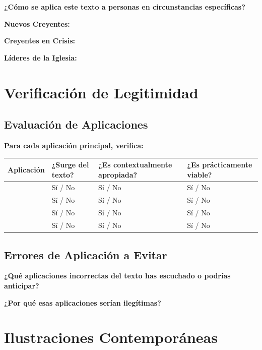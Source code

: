 \documentclass[11pt,a4paper]{article}
\begin{document}
\textbf{¿Cómo se aplica este texto a personas en circunstancias específicas?}

\textbf{Nuevos Creyentes:}
\vspace{2cm}

\textbf{Creyentes en Crisis:}
\vspace{2cm}

\textbf{Líderes de la Iglesia:}
\vspace{2cm}

\newpage

\section{Verificación de Legitimidad}

\subsection{Evaluación de Aplicaciones}

\textbf{Para cada aplicación principal, verifica:}

\begin{tabular}{|p{4cm}|p{3cm}|p{3cm}|p{3cm}|}
\hline
\textbf{Aplicación} & \textbf{¿Surge del texto?} & \textbf{¿Es contextualmente apropiada?} & \textbf{¿Es prácticamente viable?} \\
\hline
& Sí / No & Sí / No & Sí / No \\[1cm]
\hline
& Sí / No & Sí / No & Sí / No \\[1cm]
\hline
& Sí / No & Sí / No & Sí / No \\[1cm]
\hline
& Sí / No & Sí / No & Sí / No \\[1cm]
\hline
\end{tabular}

\subsection{Errores de Aplicación a Evitar}

\textbf{¿Qué aplicaciones incorrectas del texto has escuchado o podrías anticipar?}
\vspace{3cm}

\textbf{¿Por qué esas aplicaciones serían ilegítimas?}
\vspace{3cm}

\section{Ilustraciones Contemporáneas}
\end{document}
